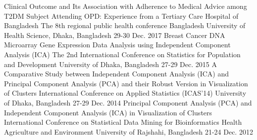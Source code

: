 

\begin{cventries}

  \cventry
    {Clinical Outcome and Its Association with Adherence to Medical Advice among T2DM Subject Attending OPD: Experience from a Tertiary Care Hospital of Bangladesh} %
    {The 8th regional public health conference} %
    {Bangladesh University of Health Science, Dhaka, Bangladesh} %
    {29-30 Dec. 2017} %
    {
    }
\vspace{-.5\baselineskip}
  \cventry
    {Breast Cancer DNA Microarray Gene Expression Data Analysis using Independent Component Analysis (ICA)} %
    {The 2nd International Conference on Statistics for Population and Development} %
    {University of Dhaka, Bangladesh} %
    {27-29 Dec. 2015} %
    {
    }
\vspace{-.5\baselineskip}
  \cventry
    {A Comparative Study between Independent Component Analysis (ICA) and Principal Component Analysis (PCA) and their Robust Version in Visualization of Clusters} %
    {International Conference on Applied Statistics (ICAS’14)} %
    {University of Dhaka, Bangladesh} %
    {27-29 Dec. 2014} %
    {
    }
\vspace{-.5\baselineskip}
  \cventry
    {Principal Component Analysis (PCA) and Independent Component Analysis (ICA)  in Visualization of Clusters} %
    {International Conference on Statistical Data Mining for Bioinformatics Health Agriculture and Environment} %
    {University of Rajshahi, Bangladesh} %
    {21-24 Dec. 2012} %
    {
    }



\end{cventries}
